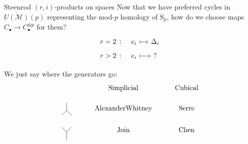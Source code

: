 \documentclass[10pt,t]{beamer}
\renewcommand{\S}{\mathrm{S}}
\newcommand{\M}{\overline{U(\mathcal M)}}
\begin{document}
\begin{frame}[fragile]{Steenrod $(r,i)$-products on spaces}
	Now that we have preferred cycles in $\M(p)$ representing the mod-$p$ homology of $\S_p$, how do we choose maps $C_\bullet \to C_\bullet^{\otimes p}$ for them?
	\begin{equation*}
	\begin{tikzcd}[column sep=small, row sep=tiny]
	r = 2 \ \colon &[-10pt] e_i \arrow[r, |->] & \Delta_i \\
	r > 2 \ \colon & e_i \arrow[r, |->] & ?
	\end{tikzcd}
	\end{equation*}
	
	\pause
	
	We just say where the generators go:
	\begin{equation*}
	\begin{tikzcd}[row sep = small]
	& \mathrm{Simplicial} & \mathrm{Cubical} \\
	\begin{tikzpicture}[scale=.5]
	\draw (0,0)--(0,.75);
	\draw (0,0)--(.5,-.5);
	\draw (0,0)--(-.5,-.5);
	\end{tikzpicture}
	& \mathrm{Alexander}\mathrm{Whitney} & \mathrm{Serre} \\
	\begin{tikzpicture}[scale=.5]
	\draw (0,0)--(0,-.75);
	\draw (0,0)--(.5,.5);
	\draw (0,0)--(-.5,.5);
	\end{tikzpicture}
	& \mathrm{Join} & \mathrm{Chen}
	\end{tikzcd}
	\end{equation*}	
\end{frame}


\end{document}
